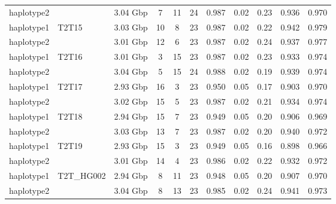 \begin{table}[t]
\begin{tabular*}{0.9\linewidth}{@{\extracolsep{\fill}}l|lccccccccc}
haplotype2 &  & 3.04 Gbp & 7 & 11 & 24 & 0.987 & 0.02 & 0.23 & 0.936 & 0.970 \\ 
haplotype1 & {T2T15} & {3.03 Gbp} & {10} & {8} & {23} & {0.987} & {0.02} & {0.22} & {0.942} & {0.979} \\ 
haplotype2 &  & 3.01 Gbp & 12 & 6 & 23 & 0.987 & 0.02 & 0.24 & 0.937 & 0.977 \\ 
haplotype1 & {T2T16} & {3.01 Gbp} & {3} & {15} & {23} & {0.987} & {0.02} & {0.23} & {0.933} & {0.974} \\ 
haplotype2 &  & 3.04 Gbp & 5 & 15 & 24 & 0.988 & 0.02 & 0.19 & 0.939 & 0.974 \\ 
haplotype1 & {T2T17} & {2.93 Gbp} & {16} & {3} & {23} & {0.950} & {0.05} & {0.17} & {0.903} & {0.970} \\ 
haplotype2 &  & 3.02 Gbp & 15 & 5 & 23 & 0.987 & 0.02 & 0.21 & 0.934 & 0.974 \\ 
haplotype1 & {T2T18} & {2.94 Gbp} & {15} & {7} & {23} & {0.949} & {0.05} & {0.20} & {0.906} & {0.969} \\ 
haplotype2 &  & 3.03 Gbp & 13 & 7 & 23 & 0.987 & 0.02 & 0.20 & 0.940 & 0.972 \\ 
haplotype1 & {T2T19} & {2.93 Gbp} & {15} & {3} & {23} & {0.949} & {0.05} & {0.16} & {0.898} & {0.966} \\ 
haplotype2 &  & 3.01 Gbp & 14 & 4 & 23 & 0.986 & 0.02 & 0.22 & 0.932 & 0.972 \\ 
haplotype1 & {T2T\_HG002} & {2.94 Gbp} & {8} & {11} & {23} & {0.948} & {0.05} & {0.20} & {0.907} & {0.970} \\ 
haplotype2 &  & 3.04 Gbp & 8 & 13 & 23 & 0.985 & 0.02 & 0.24 & 0.941 & 0.973 \\ 
\bottomrule
\end{tabular*}
\end{table}

